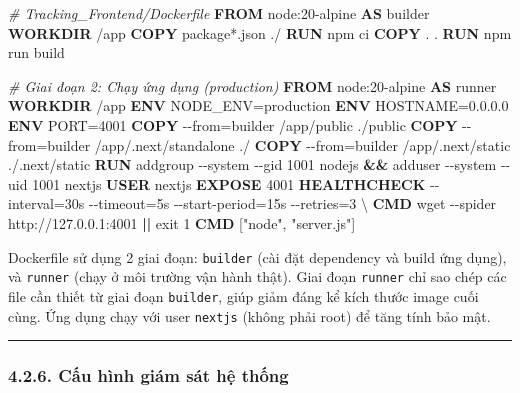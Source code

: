 \documentclass[a4paper]{extarticle}
\newenvironment{Shaded}{}{}
\newcommand{\AttributeTok}[1]{\textcolor[rgb]{0.49,0.56,0.16}{#1}}
\newcommand{\BuiltInTok}[1]{\textcolor[rgb]{0.00,0.50,0.00}{#1}}
\newcommand{\CommentTok}[1]{\textcolor[rgb]{0.38,0.63,0.69}{\textit{#1}}}
\newcommand{\ExtensionTok}[1]{#1}
\newcommand{\FunctionTok}[1]{\textcolor[rgb]{0.02,0.16,0.49}{#1}}
\newcommand{\KeywordTok}[1]{\textcolor[rgb]{0.00,0.44,0.13}{\textbf{#1}}}
\newcommand{\NormalTok}[1]{#1}
\newcommand{\OperatorTok}[1]{\textcolor[rgb]{0.40,0.40,0.40}{#1}}
\newcommand{\StringTok}[1]{\textcolor[rgb]{0.25,0.44,0.63}{#1}}
\begin{document}
\begin{Shaded}
\begin{Highlighting}[]
\CommentTok{\# Tracking\_Frontend/Dockerfile}
\KeywordTok{FROM}\NormalTok{ node:20{-}alpine }\KeywordTok{AS}\NormalTok{ builder}
\KeywordTok{WORKDIR}\NormalTok{ /app}
\KeywordTok{COPY}\NormalTok{ package*.json ./}
\KeywordTok{RUN} \ExtensionTok{npm}\NormalTok{ ci}
\KeywordTok{COPY}\NormalTok{ . .}
\KeywordTok{RUN} \ExtensionTok{npm}\NormalTok{ run build}

\CommentTok{\# Giai đoạn 2: Chạy ứng dụng (production)}
\KeywordTok{FROM}\NormalTok{ node:20{-}alpine }\KeywordTok{AS}\NormalTok{ runner}
\KeywordTok{WORKDIR}\NormalTok{ /app}
\KeywordTok{ENV}\NormalTok{ NODE\_ENV=production}
\KeywordTok{ENV}\NormalTok{ HOSTNAME=0.0.0.0}
\KeywordTok{ENV}\NormalTok{ PORT=4001}
\KeywordTok{COPY} \OperatorTok{{-}{-}from=builder}\NormalTok{ /app/public ./public}
\KeywordTok{COPY} \OperatorTok{{-}{-}from=builder}\NormalTok{ /app/.next/standalone ./}
\KeywordTok{COPY} \OperatorTok{{-}{-}from=builder}\NormalTok{ /app/.next/static ./.next/static}
\KeywordTok{RUN} \ExtensionTok{addgroup} \AttributeTok{{-}{-}system} \AttributeTok{{-}{-}gid}\NormalTok{ 1001 nodejs }\KeywordTok{\&\&} \ExtensionTok{adduser} \AttributeTok{{-}{-}system} \AttributeTok{{-}{-}uid}\NormalTok{ 1001 nextjs}
\KeywordTok{USER}\NormalTok{ nextjs}
\KeywordTok{EXPOSE}\NormalTok{ 4001}
\KeywordTok{HEALTHCHECK} \OperatorTok{{-}{-}interval=30s} \OperatorTok{{-}{-}timeout=5s} \OperatorTok{{-}{-}start{-}period=15s} \OperatorTok{{-}{-}retries=3}\NormalTok{ \textbackslash{}}
  \KeywordTok{CMD} \FunctionTok{wget} \AttributeTok{{-}{-}spider}\NormalTok{ http://127.0.0.1:4001 }\KeywordTok{||} \BuiltInTok{exit}\NormalTok{ 1}
\KeywordTok{CMD}\NormalTok{ [}\StringTok{"node"}\NormalTok{, }\StringTok{"server.js"}\NormalTok{]}
\end{Highlighting}
\end{Shaded}

Dockerfile sử dụng 2 giai đoạn: \texttt{builder} (cài đặt dependency và
build ứng dụng), và \texttt{runner} (chạy ở môi trường vận hành thật). Giai đoạn
\texttt{runner} chỉ sao chép các file cần thiết từ giai đoạn
\texttt{builder}, giúp giảm đáng kể kích thước image cuối cùng. Ứng dụng
chạy với user \texttt{nextjs} (không phải root) để tăng tính bảo mật.

\begin{center}\rule{0.5\linewidth}{0.5pt}\end{center}

\subsubsection{4.2.6. Cấu hình giám sát hệ thống}\label{426-cux1ea5u-huxecnh-giuxe1m-suxe1t-hux1ec7-thux1ed1ng-monitoring--observability}
\end{document}
